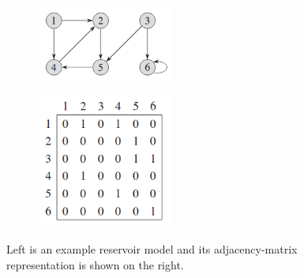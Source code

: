 \begin{figure}[h!]
  \centering
  \begin{subfigure}[b]{0.49\textwidth}
    \includegraphics[width=0.49\textwidth]{Figures/directedGraphDiagram.png}
    \label{Fig:DirectedGraph}
  \end{subfigure}
  \begin{subfigure}[b]{0.49\textwidth}
    \includegraphics[width=0.49\textwidth]{Figures/adjMatrix.png}
    \label{Fig:AdjMatrix}
  \end{subfigure}
  \caption{Left is an example reservoir model and its adjacency-matrix representation is shown on the right.} 
\end{figure}

